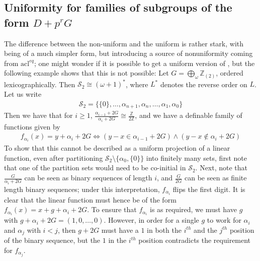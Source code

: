 \documentclass[a4paper,11pt]{article}
\renewcommand{\iff}{\Longleftrightarrow}
\newcommand{\acl}{\textrm{acl}}
\newcommand{\nl}{\newline}
\begin{document}
\subsection{Uniformity for families of subgroups of the form $D+p^rG$}
The difference between the non-uniform  and the
uniform  is rather stark, with  being of a much simpler form, but introducing a source of
nonuniformity coming from $\acl^{eq}$; one might wonder if it is possible to
get a uniform version of , but the following
example shows that this is not possible:
\nl\nl
Let $G=\bigoplus_\omega\mathbb{Z}_{(2)}$, ordered lexicographically. Then $\mathcal{S}_2 \cong(\omega+1)^*$, where $L^*$ denotes the reverse order on
$L$. Let us write
\begin{align*}
    \mathcal{S}_2 = \{\{0\}, \dots, \alpha_{n+1},\alpha_n,\dots,\alpha_1,\alpha_0\}
\end{align*}
Then we have that for $i\geq 1$, $\frac{\alpha_{i-1}+2G}{\alpha_i+2G}
\cong\frac{\mathbb{Z}}{2\mathbb{Z}}$, and we have a definable family of
functions given by
\begin{align*}
    f_{\alpha_i}(x) = y+\alpha_i+2G \iff (y-x \in \alpha_{i-1}+2G)\wedge(y-x \notin \alpha_{i}+2G)
\end{align*}
To show that this cannot be described as a uniform projection of a linear
function, even after partitioning $\mathcal{S}_2\setminus\{\alpha_0,\{0\}\}$
into finitely many sets, first note that one of the partition sets would need
to be co-initial in $\mathcal{S}_2$. Next, note that $\frac{G}{\alpha_i+2G}$
can be seen as binary sequences of length $i$, and $\frac{G}{2G}$ can be seen
as finite length binary sequences; under this interpretation, $f_{\alpha_i}$
flips the first digit. It is clear that the linear function must hence be of
the form $f_{\alpha_i}(x) = x+g+\alpha_i+2G$.
To ensure that $f_{\alpha_i}$ is as required, we must have $g$ with
$g+\alpha_i+2G = (1,0,\dots,0)$. However, in order for a single $g$ to work for
$\alpha_i$ and $\alpha_j$ with $i< j$, then $g+2G$ must have a $1$ in both the
$i^{th}$ and the $j^{th}$ position of the binary sequence, but the $1$ in the
$i^{th}$ position contradicts the requirement for $f_{\alpha_j}$.

%

\printbibliography[title={References}]



\end{document}
